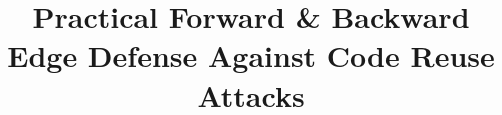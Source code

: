 \documentclass[compsoc, conference, letterpaper, 10pt, times]{IEEEtran}
\theoremstyle{definition}
\begin{document}

\title{Practical Forward \& Backward Edge Defense Against Code Reuse Attacks}






\pagestyle{plain}

\thispagestyle{empty}

\maketitle
\end{document}
